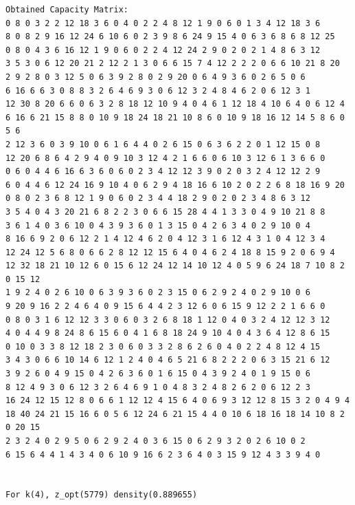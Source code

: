 \documentclass[11pt]{article}
\begin{document}
\begin{lstlisting}
Obtained Capacity Matrix:
0 8 0 3 2 2 12 18 3 6 0 4 0 2 2 4 8 12 1 9 0 6 0 1 3 4 12 18 3 6
8 0 8 2 9 16 12 24 6 10 6 0 2 3 9 8 6 24 9 15 4 0 6 3 6 8 6 8 12 25
0 8 0 4 3 6 16 12 1 9 0 6 0 2 2 4 12 24 2 9 0 2 0 2 1 4 8 6 3 12
3 5 3 0 6 12 20 21 2 12 2 1 3 0 6 6 15 7 4 12 2 2 2 0 6 6 10 21 8 20
2 9 2 8 0 3 12 5 0 6 3 9 2 8 0 2 9 20 0 6 4 9 3 6 0 2 6 5 0 6
6 16 6 6 3 0 8 8 3 2 6 4 6 9 3 0 6 12 3 2 4 8 4 6 2 0 6 12 3 1
12 30 8 20 6 6 0 6 3 2 8 18 12 10 9 4 0 4 6 1 12 18 4 10 6 4 0 6 12 4
6 16 6 21 15 8 8 0 10 9 18 24 18 21 10 8 6 0 10 9 18 16 12 14 5 8 6 0 5 6
2 12 3 6 0 3 9 10 0 6 1 6 4 4 0 2 6 15 0 6 3 6 2 2 0 1 12 15 0 8
12 20 6 8 6 4 2 9 4 0 9 10 3 12 4 2 1 6 6 0 6 10 3 12 6 1 3 6 6 0
0 6 0 4 4 6 16 6 3 6 0 6 0 2 3 4 12 12 3 9 0 2 0 3 2 4 12 12 2 9
6 0 4 4 6 12 24 16 9 10 4 0 6 2 9 4 18 16 6 10 2 0 2 2 6 8 18 16 9 20
0 8 0 2 3 6 8 12 1 9 0 6 0 2 3 4 4 18 2 9 0 2 0 2 3 4 8 6 3 12
3 5 4 0 4 3 20 21 6 8 2 2 3 0 6 6 15 28 4 4 1 3 3 0 4 9 10 21 8 8
3 6 1 4 0 3 6 10 0 4 3 9 3 6 0 1 3 15 0 4 2 6 3 4 0 2 9 10 0 4
8 16 6 9 2 0 6 12 2 1 4 12 4 6 2 0 4 12 3 1 6 12 4 3 1 0 4 12 3 4
12 24 12 5 6 8 0 6 6 2 8 12 12 15 6 4 0 4 6 2 4 18 8 15 9 2 0 6 9 4
12 32 18 21 10 12 6 0 15 6 12 24 12 14 10 12 4 0 5 9 6 24 18 7 10 8 2 0 15 12
1 9 2 4 0 2 6 10 0 6 3 9 3 6 0 2 3 15 0 6 2 9 2 4 0 2 9 10 0 6
9 20 9 16 2 2 4 6 4 0 9 15 6 4 4 2 3 12 6 0 6 15 9 12 2 2 1 6 6 0
0 8 0 3 1 6 12 12 3 3 0 6 0 3 2 6 8 18 1 12 0 4 0 3 2 4 12 12 3 12
4 0 4 4 9 8 24 8 6 15 6 0 4 1 6 8 18 24 9 10 4 0 4 3 6 4 12 8 6 15
0 10 0 3 3 8 12 18 2 3 0 6 0 3 3 2 8 6 2 6 0 4 0 2 2 4 8 12 4 15
3 4 3 0 6 6 10 14 6 12 1 2 4 0 4 6 5 21 6 8 2 2 2 0 6 3 15 21 6 12
3 9 2 6 0 4 9 15 0 4 2 6 3 6 0 1 6 15 0 4 3 9 2 4 0 1 9 15 0 6
8 12 4 9 3 0 6 12 3 2 6 4 6 9 1 0 4 8 3 2 4 8 2 6 2 0 6 12 2 3
16 24 12 15 12 8 0 6 6 1 12 12 4 15 6 4 0 6 9 3 12 12 8 15 3 2 0 4 9 4
18 40 24 21 15 16 6 0 5 6 12 24 6 21 15 4 4 0 10 6 18 16 18 14 10 8 2 0 20 15
2 3 2 4 0 2 9 5 0 6 2 9 2 4 0 3 6 15 0 6 2 9 3 2 0 2 6 10 0 2
6 15 6 4 4 1 4 3 4 0 6 10 9 16 6 2 3 6 4 0 3 15 9 12 4 3 3 9 4 0


For k(4), z_opt(5779) density(0.889655)


\end{lstlisting}
\end{document}
